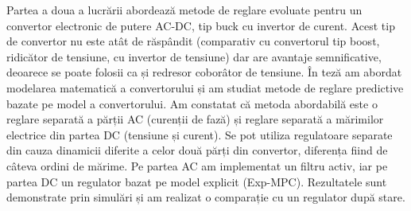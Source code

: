 	Partea a doua a lucrării abordează metode de reglare evoluate pentru un convertor electronic de putere AC-DC, tip buck cu invertor de curent. Acest tip de convertor nu este atât de răspândit (comparativ cu convertorul tip boost, ridicător de tensiune, cu invertor de tensiune) dar are avantaje semnificative, deoarece se poate folosii ca și redresor coborâtor de tensiune. În teză am abordat modelarea matematică a convertorului și am studiat metode de reglare predictive bazate pe model a convertorului. Am constatat că metoda abordabilă este o reglare separată a părții AC (curenții de fază) și reglare separată a mărimilor electrice din partea DC (tensiune și curent). Se pot utiliza regulatoare separate din cauza dinamicii diferite a celor două părți din convertor, diferența fiind de câteva ordini de mărime. Pe partea AC am implementat un filtru activ, iar pe partea DC un regulator bazat pe model explicit (Exp-MPC). Rezultatele sunt demonstrate prin  simulări și am realizat o comparație cu un regulator după stare.

\thispagestyle{plain}



